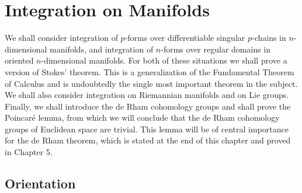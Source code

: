 \chapter{Integration on Manifolds}

We shall consider integration of $p$-forms over differentiable singular $p$-chains in $n$-dimensional manifolds, and integration of $n$-forms over regular domains in oriented $n$-dimensional manifolds. For both of these situations we shall prove a version of Stokes' theorem. This is a generalization of the Fundamental Theorem of Calculus and is undoubtedly the single most important theorem in the subject. We shall also consider integration on Riemannian manifolds and on Lie groups. Finally, we shall introduce the de Rham cohomology groups and shall prove the Poincaré lemma, from which we will conclude that the de Rham cohomology groups of Euclidean space are trivial. This lemma will be of central importance for the de Rham theorem, which is stated at the end of this chapter and proved in Chapter 5.

\section{Orientation}


